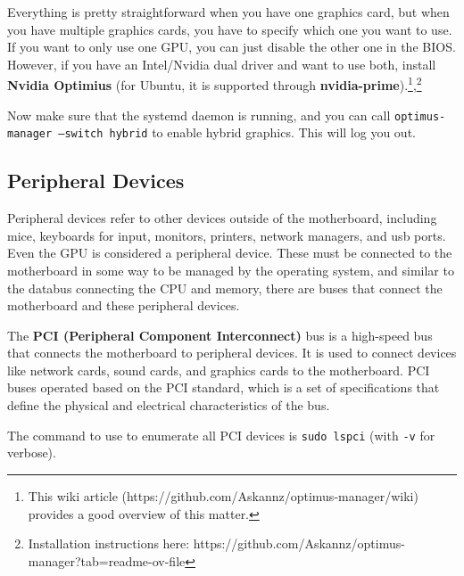 \documentclass{article}
\begin{document}
      Everything is pretty straightforward when you have one graphics card, but when you have multiple graphics cards, you have to specify which one you want to use. If you want to only use one GPU, you can just disable the other one in the BIOS. However, if you have an Intel/Nvidia dual driver and want to use both, install \textbf{Nvidia Optimius} (for Ubuntu, it is supported through \textbf{nvidia-prime}).\footnote{This wiki article (https://github.com/Askannz/optimus-manager/wiki) provides a good overview of this matter. },\footnote{Installation instructions here: https://github.com/Askannz/optimus-manager?tab=readme-ov-file} 

      Now make sure that the systemd daemon is running, and you can call \texttt{optimus-manager --switch hybrid} to enable hybrid graphics. This will log you out. 

    \subsection{Peripheral Devices} 
      
      Peripheral devices refer to other devices outside of the motherboard, including mice, keyboards for input, monitors, printers, network managers, and usb ports. Even the GPU is considered a peripheral device. These must be connected to the motherboard in some way to be managed by the operating system, and similar to the databus connecting the CPU and memory, there are buses that connect the motherboard and these peripheral devices. 

      \begin{definition}
        The \textbf{PCI (Peripheral Component Interconnect)} bus is a high-speed bus that connects the motherboard to peripheral devices. It is used to connect devices like network cards, sound cards, and graphics cards to the motherboard. PCI buses operated based on the PCI standard, which is a set of specifications that define the physical and electrical characteristics of the bus. 
      \end{definition}

      The command to use to enumerate all PCI devices is \texttt{sudo lspci} (with \texttt{-v} for verbose). 
      
\end{document}
